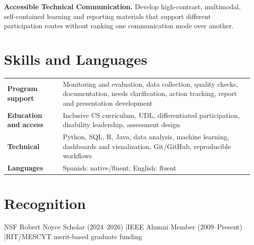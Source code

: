 \documentclass[10pt,letterpaper]{article}
\begin{document}
\textbf{Accessible Technical Communication.}
Develop high-contrast, multimodal, self-contained learning and reporting
materials that support different participation routes without ranking one
communication mode over another.

\section*{Skills and Languages}
\begin{tabularx}{\textwidth}{@{}>{\bfseries}l X@{}}
Program support & Monitoring and evaluation, data collection, quality checks, documentation, needs clarification, action tracking, report and presentation development\\
Education and access & Inclusive CS curriculum, UDL, differentiated participation, disability leadership, assessment design\\
Technical & Python, SQL, R, Java, data analysis, machine learning, dashboards and visualization, Git/GitHub, reproducible workflows\\
Languages & Spanish: native/fluent; English: fluent\\
\end{tabularx}

\section*{Recognition}
NSF Robert Noyce Scholar (2024--2026)
\enspace|\enspace IEEE Alumni Member (2009--Present)
\enspace|\enspace RIT/MESCYT merit-based graduate funding
\end{document}

